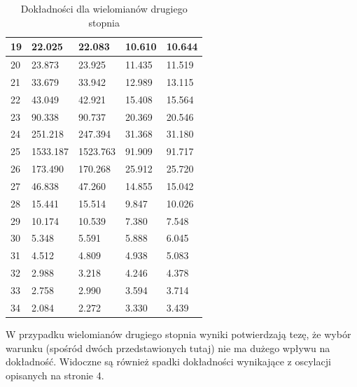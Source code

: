 \documentclass{article}
\begin{document}
\begin{table}[H]
\begin{tabular}{|l|ll|ll|}
19 & \multicolumn{1}{l|}{22.025}   & 22.083    & \multicolumn{1}{l|}{10.610}    & 10.644    \\ \hline
20 & \multicolumn{1}{l|}{23.873}   & 23.925    & \multicolumn{1}{l|}{11.435}    & 11.519    \\ \hline
21 & \multicolumn{1}{l|}{33.679}   & 33.942    & \multicolumn{1}{l|}{12.989}    & 13.115    \\ \hline
22 & \multicolumn{1}{l|}{43.049}   & 42.921    & \multicolumn{1}{l|}{15.408}    & 15.564    \\ \hline
23 & \multicolumn{1}{l|}{90.338}   & 90.737    & \multicolumn{1}{l|}{20.369}    & 20.546    \\ \hline
24 & \multicolumn{1}{l|}{251.218}   & 247.394    & \multicolumn{1}{l|}{31.368}    & 31.180    \\ \hline
25 & \multicolumn{1}{l|}{1533.187}   & 1523.763    & \multicolumn{1}{l|}{91.909}    & 91.717    \\ \hline
26 & \multicolumn{1}{l|}{173.490}   & 170.268    & \multicolumn{1}{l|}{25.912}    & 25.720    \\ \hline
27 & \multicolumn{1}{l|}{46.838}   & 47.260    & \multicolumn{1}{l|}{14.855}    & 15.042    \\ \hline
28 & \multicolumn{1}{l|}{15.441}   & 15.514    & \multicolumn{1}{l|}{9.847}    & 10.026    \\ \hline
29 & \multicolumn{1}{l|}{10.174}   & 10.539    & \multicolumn{1}{l|}{7.380}    & 7.548    \\ \hline
30 & \multicolumn{1}{l|}{5.348}   & 5.591    & \multicolumn{1}{l|}{5.888}    & 6.045    \\ \hline
31 & \multicolumn{1}{l|}{4.512}   & 4.809    & \multicolumn{1}{l|}{4.938}    & 5.083    \\ \hline
32 & \multicolumn{1}{l|}{2.988}   & 3.218    & \multicolumn{1}{l|}{4.246}    & 4.378    \\ \hline
33 & \multicolumn{1}{l|}{2.758}   & 2.990    & \multicolumn{1}{l|}{3.594}    & 3.714    \\ \hline
34 & \multicolumn{1}{l|}{2.084}   & 2.272    & \multicolumn{1}{l|}{3.330}    & 3.439    \\ \hline
\end{tabular}
\caption{Dokładności dla wielomianów drugiego stopnia}
\end{table}

W przypadku wielomianów drugiego stopnia wyniki potwierdzają tezę, że wybór warunku (spośród dwóch
przedstawionych tutaj) nie ma dużego wpływu na dokładność. Widoczne są również spadki dokładności wynikające z oscylacji
opisanych na stronie 4.
\end{document}
